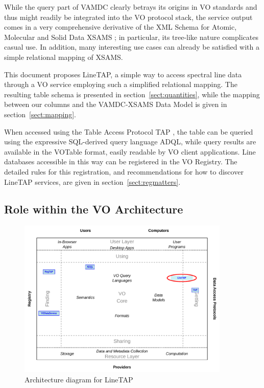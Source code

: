 \documentclass[11pt,a4paper]{ivoa}
\begin{document}
While the query part of VAMDC clearly betrays its origins in VO
standards and thus might readily be integrated into the VO protocol
stack, the service output comes in a very comprehensive derivative of
the XML Schema for Atomic, Molecular and Solid Data XSAMS
\citep{XSAMS:Docs}; in particular, its tree-like nature complicates
casual use.  In addition, many interesting use cases can already be
satisfied with a simple relational mapping of XSAMS.

This document proposes LineTAP, a simple way to access spectral line
data through a VO service employing such a simplified relational
mapping.  The resulting table schema is presented in
section~\ref{sect:quantities}, while the mapping between our columns and the
VAMDC-XSAMS Data Model is given in section~\ref{sect:mapping}.

When accessed using the Table Access Protocol TAP
\citep{2019ivoa.spec.0927D}, the table can be queried using the
expressive SQL-derived query language ADQL, while query results are
available in the VOTable format, easily readable by VO client
applications.  Line databases accessible in this way can be registered
in the VO Registry.  The detailed rules for this registration, and
recommendations for how to discover LineTAP services, are given in
section~\ref{sect:regmatters}.

\subsection{Role within the VO Architecture}

\begin{figure}
\centering


\includegraphics[width=0.9\textwidth]{role_diagram.pdf}
\caption{Architecture diagram for LineTAP}
\label{fig:archdiag}
\end{figure}
\end{document}
